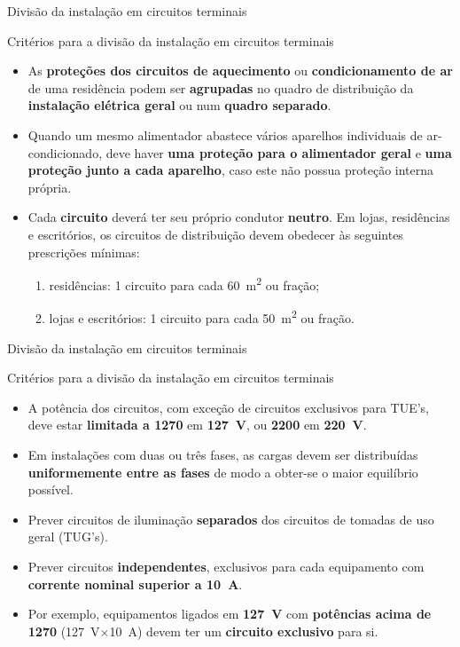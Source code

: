 \begin{frame}{Divisão da instalação em circuitos terminais}
	\begin{block}{Critérios para a divisão da instalação em circuitos terminais}
		\begin{itemize}
			\item As \textbf{proteções dos circuitos de aquecimento} ou \textbf{condicionamento de ar} de uma residência podem ser \textbf{agrupadas} no quadro de distribuição da \textbf{instalação elétrica geral} ou num \textbf{quadro separado}.
			\item Quando um mesmo alimentador abastece vários aparelhos individuais de ar-condicionado, deve haver \textbf{uma proteção para o alimentador geral} e \textbf{uma proteção junto a cada aparelho}, caso este não possua proteção interna própria.
			\item Cada \textbf{circuito} deverá ter seu próprio condutor \textbf{neutro}. Em lojas, residências e escritórios, os circuitos de distribuição devem obedecer às seguintes prescrições mínimas:

			      \begin{enumerate}[a]
				      \item\normalsize residências: 1 circuito para cada \SI{60}{\meter\squared} ou fração;
				      \item\normalsize lojas e escritórios: 1 circuito para cada \SI{50}{\meter\squared} ou fração.
			      \end{enumerate}
		\end{itemize}
	\end{block}
\end{frame}


\begin{frame}{Divisão da instalação em circuitos terminais}
	\begin{block}{Critérios para a divisão da instalação em circuitos terminais}
		\begin{itemize}
			\item A potência dos circuitos, com exceção de circuitos exclusivos para TUE’s, deve estar \textbf{limitada a \SI{1270}{\va}} em \textbf{\SI{127}{\volt}}, ou \textbf{\SI{2200}{\va}} em \textbf{\SI{220}{\volt}}.
			\item Em instalações com duas ou três fases, as cargas devem ser distribuídas \textbf{uniformemente entre as fases} de modo a obter-se o maior equilíbrio possível.
			\item Prever circuitos de iluminação \textbf{separados} dos circuitos de tomadas de uso geral (TUG's).
			\item Prever circuitos \textbf{independentes}, exclusivos para cada equipamento com \textbf{corrente nominal superior a \SI{10}{\ampere}}.
			\item Por exemplo, equipamentos ligados em \textbf{\SI{127}{\volt}} com \textbf{potências acima de \SI{1270}{\va}} (\SI{127}{\volt}$ \times $\SI{10}{\ampere}) devem ter um \textbf{circuito exclusivo} para si.
		\end{itemize}
	\end{block}
\end{frame}


